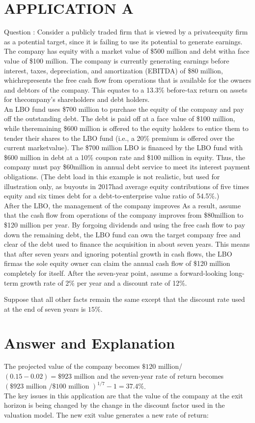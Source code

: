 \documentclass[11pt]{article}
\begin{document}
\section*{APPLICATION A}
Question : Consider a publicly traded firm that is viewed by a privateequity firm as a potential target, since it is failing to use its potential to generate earnings. The company has equity with a market value of \$500 million and debt witha face value of \$100 million. The company is currently generating earnings before interest, taxes, depreciation, and amortization (EBITDA) of \$80 million, whichrepresents the free cash flow from operations that is available for the owners and debtors of the company. This equates to a 13.3\% before-tax return on assets for thecompany’s shareholders and debt holders.\\
An LBO fund uses \$700 million to purchase the equity of the company and pay off the outstanding debt. The debt is paid off at a face value of \$100 million, while theremaining \$600 million is offered to the equity holders to entice them to tender their shares to the LBO fund (i.e., a 20\% premium is offered over the current marketvalue). The \$700 million LBO is financed by the LBO fund with \$600 million in debt at a 10\% coupon rate and \$100 million in equity. Thus, the company must pay \$60million in annual debt service to meet its interest payment obligations. (The debt load in this example is not realistic, but used for illustration only, as buyouts in 2017had average equity contributions of five times equity and six times debt for a debt-to-enterprise value ratio of 54.5\%.)\\
After the LBO, the management of the company improves As a result, assume that the cash flow from operations of the company improves from \$80million to \$120 million per year. By forgoing dividends and using the free cash flow to pay down the remaining debt, the LBO fund can own the target company free and clear of the debt used to finance the acquisition in about seven years. This means that after seven years and ignoring potential growth in cash flows, the LBO firmas the sole equity owner can claim the annual cash flow of \$120 million completely for itself. After the seven-year point, assume a forward-looking long-term growth rate of 2\% per year and a discount rate of 12\%.

Suppose that all other facts remain the same except that the discount rate used at the end of seven years is $15 \%$.

\section*{Answer and Explanation}
The projected value of the company becomes $\$ 120$ million/ $(0.15-0.02)=\$ 923$ million and the seven-year rate of return becomes $(\$ 923 \text { million } / \$ 100 \text { million })^{1 / 7}-1=37.4 \%$.\\
The key issues in this application are that the value of the company at the exit horizon is being changed by the change in the discount factor used in the valuation model. The new exit value generates a new rate of return:
\end{document}
